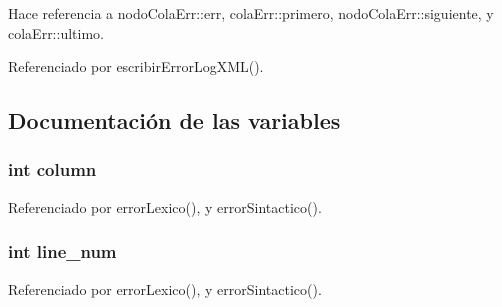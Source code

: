Hace referencia a nodo\-Cola\-Err::err, cola\-Err::primero, nodo\-Cola\-Err::siguiente, y cola\-Err::ultimo.

Referenciado por escribir\-Error\-Log\-XML().

\subsection{Documentaci\'{o}n de las variables}
\subsubsection{\setlength{\rightskip}{0pt plus 5cm}int {\bf column}}\label{colaerr_8h_a1}




Referenciado por error\-Lexico(), y error\-Sintactico().
\subsubsection{\setlength{\rightskip}{0pt plus 5cm}int {\bf line\_\-num}}\label{colaerr_8h_a0}




Referenciado por error\-Lexico(), y error\-Sintactico().